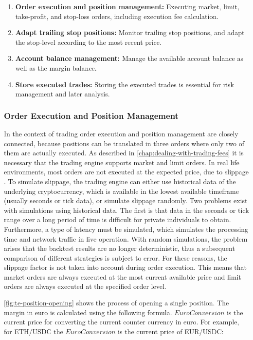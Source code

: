 \begin{enumerate}
    \item \textbf{Order execution and position management:} Executing market, limit, take-profit, and stop-loss orders, including execution fee calculation.
    \item \textbf{Adapt trailing stop positions:} Monitor trailing stop positions, and adapt the stop-level according to the most recent price.
    \item \textbf{Account balance management:} Manage the available account balance as well as the margin balance.
    \item \textbf{Store executed trades:} Storing the executed trades is essential for risk management and later analysis.
\end{enumerate}

\subsubsection{Order Execution and Position Management}

In the context of trading order execution and position management are closely connected, because positions can be translated in three orders where only two of them are actually executed.
As described in \autoref{chap:dealing-with-trading-fees} it is necessary that the trading engine supports market and limit orders.
In real life environments, most orders are not executed at the expected price, due to slippage \cite{ig-slippage}.
To simulate slippage, the trading engine can either use historical data of the underlying cryptocurrency, which is available in the lowest available timeframe (usually seconds or tick data), or simulate slippage randomly.
Two problems exist with simulations using historical data.
The first is that data in the seconds or tick range over a long period of time is difficult for private individuals to obtain.
Furthermore, a type of latency must be simulated, which simulates the processing time and network traffic in live operation.
With random simulations, the problem arises that the backtest results are no longer deterministic, thus a subsequent comparison of different strategies is subject to error.
For these reasons, the slippage factor is not taken into account during order execution.
This means that market orders are always executed at the most current available price and limit orders are always executed at the specified order level.


\autoref{fig:te-position-opening} shows the process of opening a single position.
The margin in euro is calculated using the following formula.
$EuroConversion$ is the current price for converting the current counter currency in euro.
For example, for ETH/USDC the $EuroConversion$ is the current price of EUR/USDC:

